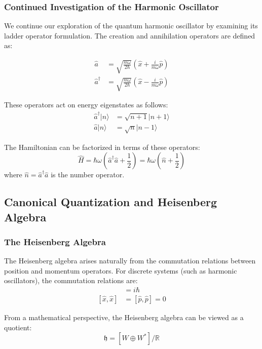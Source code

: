 \subsubsection{Continued Investigation of the Harmonic Oscillator}

We continue our exploration of the quantum harmonic oscillator by examining its ladder operator formulation. The creation and annihilation operators are defined as:

\begin{align}
\hat{a} &= \sqrt{\frac{m\omega}{2\hbar}}\left(\hat{x} + \frac{i}{m\omega}\hat{p}\right) \\
\hat{a}^\dagger &= \sqrt{\frac{m\omega}{2\hbar}}\left(\hat{x} - \frac{i}{m\omega}\hat{p}\right)
\end{align}

These operators act on energy eigenstates as follows:
\begin{align}
\hat{a}^\dagger|n\rangle &= \sqrt{n+1}|n+1\rangle \\
\hat{a}|n\rangle &= \sqrt{n}|n-1\rangle
\end{align}

The Hamiltonian can be factorized in terms of these operators:
\begin{equation}
\hat{H} = \hbar\omega\left(\hat{a}^\dagger\hat{a} + \frac{1}{2}\right) = \hbar\omega\left(\hat{n} + \frac{1}{2}\right)
\end{equation}
where $\hat{n} = \hat{a}^\dagger\hat{a}$ is the number operator.

\subsection{Canonical Quantization and Heisenberg Algebra}

\subsubsection{The Heisenberg Algebra}

The Heisenberg algebra arises naturally from the commutation relations between position and momentum operators. For discrete systems (such as harmonic oscillators), the commutation relations are:
\begin{align}
[\hat{x}, \hat{p}] &= i\hbar \\
[\hat{x}, \hat{x}] &= [\hat{p}, \hat{p}] = 0
\end{align}

From a mathematical perspective, the Heisenberg algebra can be viewed as a quotient:
\begin{equation}
\mathfrak{h} = \left[ W \oplus W^{*} \right]/\mathbb{R}
\end{equation}

